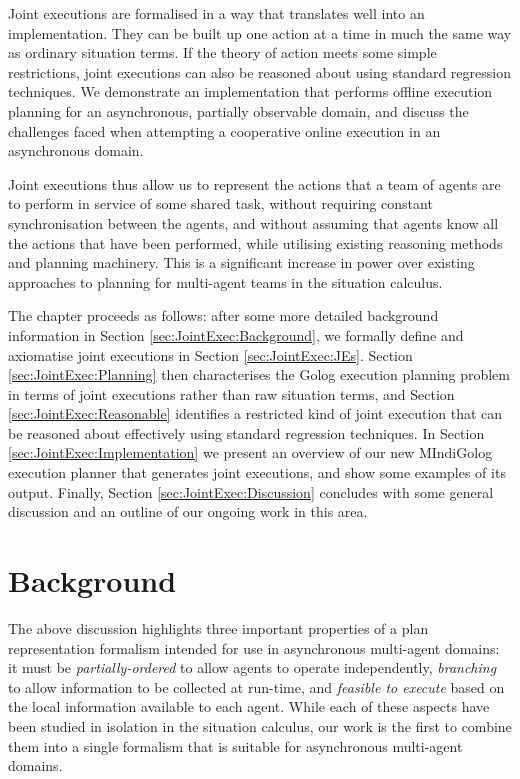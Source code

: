 Joint executions are formalised in a way that translates well into
an implementation. They can be built up one action at a time in much
the same way as ordinary situation terms. If the theory of action
meets some simple restrictions, joint executions can also be reasoned
about using standard regression techniques. We demonstrate an implementation
that performs offline execution planning for an asynchronous, partially
observable domain, and discuss the challenges faced when attempting
a cooperative online execution in an asynchronous domain.

Joint executions thus allow us to represent the actions that a team
of agents are to perform in service of some shared task, without requiring
constant synchronisation between the agents, and without assuming
that agents know all the actions that have been performed, while utilising
existing reasoning methods and planning machinery. This is a significant
increase in power over existing approaches to planning for multi-agent
teams in the situation calculus.

The chapter proceeds as follows: after some more detailed background
information in Section \ref{sec:JointExec:Background}, we formally
define and axiomatise joint executions in Section \ref{sec:JointExec:JEs}.
Section \ref{sec:JointExec:Planning} then characterises the Golog
execution planning problem in terms of joint executions rather than
raw situation terms, and Section \ref{sec:JointExec:Reasonable} identifies
a restricted kind of joint execution that can be reasoned about effectively
using standard regression techniques. In Section \ref{sec:JointExec:Implementation}
we present an overview of our new MIndiGolog execution planner that
generates joint executions, and show some examples of its output.
Finally, Section \ref{sec:JointExec:Discussion} concludes with some
general discussion and an outline of our ongoing work in this area.


\section{Background\label{sec:JointExec:Background}}

The above discussion highlights three important properties of a plan
representation formalism intended for use in asynchronous multi-agent
domains: it must be \emph{partially-ordered} to allow agents to operate
independently, \emph{branching} to allow information to be collected
at run-time, and \emph{feasible to execute} based on the local information
available to each agent. While each of these aspects have been studied
in isolation in the situation calculus, our work is the first to combine
them into a single formalism that is suitable for asynchronous multi-agent
domains.


